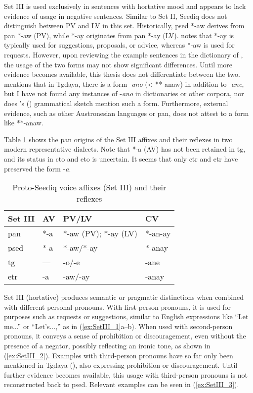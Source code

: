 Set III is used exclusively in sentences with hortative mood and appears to lack evidence of usage in negative sentences. Similar to Set II, Seediq does not distinguish between PV and LV in this set. Historically, \acl{psed} *-aw derives from \acl{pan} *-aw (PV), while *-ay originates from \acl{pan} *-ay (LV). \textcite[103]{Lee2018Trugrammar} notes that *-ay is typically used for suggestions, proposals, or advice, whereas *-aw is used for requests. However, upon reviewing the example sentences in the dictionary of \textcite{ILRDFEdict}, the usage of the two forms may not show significant differences. Until more evidence becomes available, this thesis does not differentiate between the two. \textcite[97]{Sung2018Sedgrammar} mentions that in Tgdaya, there is a form -\textit{ano} (< **-anaw) in addition to -\textit{ane}, but I have not found any instances of -\textit{ano} in dictionaries or other corpora, nor does \citeauthor{ochiai2016phd}'s (\citeyear{ochiai2016phd}) grammatical sketch mention such a form. Furthermore, external evidence, such as other Austronesian languages or \acl{pan}, does not attest to a form like **-anaw.

Table \ref{tab:psed_voi_III} shows the \acl{pan} origins of the Set III affixes and their reflexes in two modern representative dialects. Note that *-a (AV) has not been retained in \acl{tg}, and its status in \acl{cto} and \acl{eto} is uncertain. It seems that only \acl{ctr} and \acl{etr} have preserved the form -\textit{a}.

\begin{table}[!htbp]
\centering
\caption{Proto-Seediq voice affixes (Set III) and their reflexes}
\label{tab:psed_voi_III}
\begin{tabular}{llll}
\hline
Set III   & AV  & PV/LV                & CV      \\ \hline
\ac{pan}  & *-a & *-aw (PV); *-ay (LV) & *-an-ay \\
\ac{psed} & *-a & *-aw/*-ay            & *-anay  \\
\ac{tg}   & --- & -o/-e                & -ane    \\
\ac{etr}  & -a  & -aw/-ay              & -anay   \\ \hline
\end{tabular}
\end{table}

Set III (hortative) produces semantic or pragmatic distinctions when combined with different personal pronouns. With first-person pronouns, it is used for purposes such as requests or suggestions, similar to English expressions like ``Let me...'' or ``Let's...,'' as in (\ref{ex:SetIII_1}a--b). When used with second-person pronouns, it conveys a sense of prohibition or discouragement, even without the presence of a negator, possibly reflecting an ironic tone, as shown in (\ref{ex:SetIII_2}). Examples with third-person pronouns have so far only been mentioned in Tgdaya (\cite[97--98]{ochiai2016phd}), also expressing prohibition or discouragement. Until further evidence becomes available, this usage with third-person pronouns is not reconstructed back to \acl{psed}. Relevant examples can be seen in (\ref{ex:SetIII_3}).


